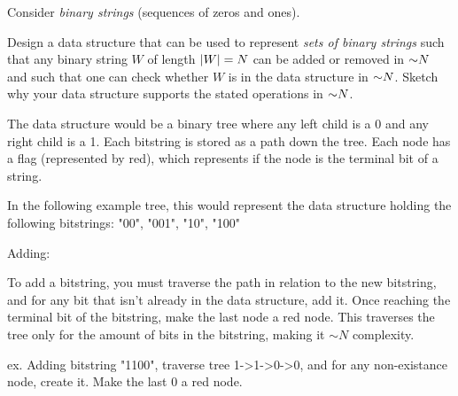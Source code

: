 \begin{problem}
Consider \emph{binary strings} (sequences of zeros and ones). 
\begin{questions}
\item Design a data structure  that can be used to represent \emph{sets of binary strings} such that any binary string $W$ of length $\lvert W \rvert = N$ can be added or removed in $\mathord{\sim}N$ and such that one can check whether $W$ is in the data structure in $\mathord{\sim}N$. Sketch why your data structure   supports the stated operations in $\mathord{\sim}N$.

The data structure would be a binary tree where any left child is a 0 and any right child is a 1. Each bitstring is stored as a path down the tree. Each node has a flag (represented by red), which represents if the node is the terminal bit of a string.

In the following example tree, this would represent the data structure holding the following bitstrings: "00", "001", "10", "100"


Adding:

To add a bitstring, you must traverse the path in relation to the new bitstring, and for any bit that isn't already in the data structure, add it. Once reaching the terminal bit of the bitstring, make the last node a red node.
This traverses the tree only for the amount of bits in the bitstring, making it $\sim N$ complexity.

ex. Adding bitstring "1100", traverse tree 1->1->0->0, and for any non-existance node, create it. Make the last 0 a red node.

\end{questions}
\end{problem}
